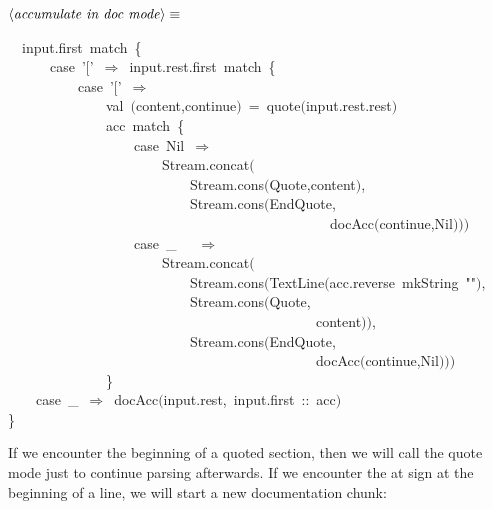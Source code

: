 \documentclass[a4paper,12pt]{article}
\begin{document}
$\left<\mbox{\emph{accumulate in doc mode}}\right>\equiv$
\begin{program}~~input.first~{\vem match}~{\small\{}
\\~~~~~~{\vem case}~'$[$'~$\Rightarrow$~input.rest.first~{\vem match}~{\small\{}
\\~~~~~~~~~~{\vem case}~'$[$'~$\Rightarrow$
\\~~~~~~~~~~~~~~{\vem val}~$($content,continue$)$~=~quote$($input.rest.rest$)$
\\~~~~~~~~~~~~~~acc~{\vem match}~{\small\{}
\\~~~~~~~~~~~~~~~~~~{\vem case}~Nil~$\Rightarrow$
\\~~~~~~~~~~~~~~~~~~~~~~Stream.concat$($
\\~~~~~~~~~~~~~~~~~~~~~~~~~~Stream.cons$($Quote,content$)$,
\\~~~~~~~~~~~~~~~~~~~~~~~~~~Stream.cons$($EndQuote,
\\~~~~~~~~~~~~~~~~~~~~~~~~~~~~~~~~~~~~~~~~~~~~~~docAcc$($continue,Nil$)$$)$$)$
\\~~~~~~~~~~~~~~~~~~{\vem case}~\_~~~$\Rightarrow$
\\~~~~~~~~~~~~~~~~~~~~~~Stream.concat$($
\\~~~~~~~~~~~~~~~~~~~~~~~~~~Stream.cons$($TextLine$($acc.reverse~mkString~""$)$,
\\~~~~~~~~~~~~~~~~~~~~~~~~~~Stream.cons$($Quote,
\\~~~~~~~~~~~~~~~~~~~~~~~~~~~~~~~~~~~~~~~~~~~~content$)$$)$,
\\~~~~~~~~~~~~~~~~~~~~~~~~~~Stream.cons$($EndQuote,
\\~~~~~~~~~~~~~~~~~~~~~~~~~~~~~~~~~~~~~~~~~~~~docAcc$($continue,Nil$)$$)$$)$
\\~~~~~~~~~~~~~~{\small\}}
\\~~~~{\vem case}~\_~$\Rightarrow$~docAcc$($input.rest,~input.first~{\rm :}{\rm :}~acc$)$
\\{\small\}}
\\[0.5em]\end{program}
If we encounter the beginning of a quoted section, then we will call
the quote mode just to continue parsing afterwards. If we encounter the
at sign at the beginning of a line, we will start a new documentation chunk:
\end{document}
